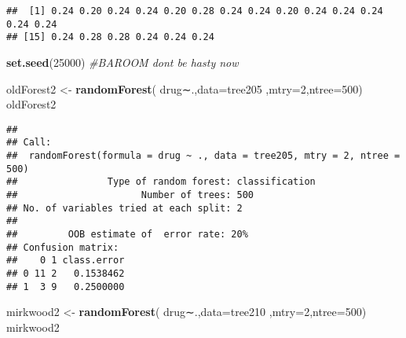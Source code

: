 \documentclass[]{article}
\newenvironment{Shaded}{\begin{snugshade}}{\end{snugshade}}
\newcommand{\KeywordTok}[1]{\textcolor[rgb]{0.13,0.29,0.53}{\textbf{#1}}}
\newcommand{\DataTypeTok}[1]{\textcolor[rgb]{0.13,0.29,0.53}{#1}}
\newcommand{\DecValTok}[1]{\textcolor[rgb]{0.00,0.00,0.81}{#1}}
\newcommand{\StringTok}[1]{\textcolor[rgb]{0.31,0.60,0.02}{#1}}
\newcommand{\CommentTok}[1]{\textcolor[rgb]{0.56,0.35,0.01}{\textit{#1}}}
\newcommand{\ControlFlowTok}[1]{\textcolor[rgb]{0.13,0.29,0.53}{\textbf{#1}}}
\newcommand{\OperatorTok}[1]{\textcolor[rgb]{0.81,0.36,0.00}{\textbf{#1}}}
\newcommand{\NormalTok}[1]{#1}
\begin{document}
\begin{Shaded}
\end{Shaded}

\begin{verbatim}
##  [1] 0.24 0.20 0.24 0.24 0.20 0.28 0.24 0.24 0.20 0.24 0.24 0.24 0.24 0.24
## [15] 0.24 0.28 0.28 0.24 0.24 0.24
\end{verbatim}

\begin{Shaded}
\begin{Highlighting}[]
\KeywordTok{set.seed}\NormalTok{(}\DecValTok{25000}\NormalTok{)}
\CommentTok{#BAROOM dont be hasty now}

\NormalTok{oldForest2 <-}\StringTok{ }\KeywordTok{randomForest}\NormalTok{( drug∼.,}\DataTypeTok{data=}\NormalTok{tree205  ,}\DataTypeTok{mtry=}\DecValTok{2}\NormalTok{,}\DataTypeTok{ntree=}\DecValTok{500}\NormalTok{)}
\NormalTok{oldForest2}
\end{Highlighting}
\end{Shaded}

\begin{verbatim}
## 
## Call:
##  randomForest(formula = drug ~ ., data = tree205, mtry = 2, ntree = 500) 
##                Type of random forest: classification
##                      Number of trees: 500
## No. of variables tried at each split: 2
## 
##         OOB estimate of  error rate: 20%
## Confusion matrix:
##    0 1 class.error
## 0 11 2   0.1538462
## 1  3 9   0.2500000
\end{verbatim}

\begin{Shaded}
\begin{Highlighting}[]
\NormalTok{mirkwood2 <-}\StringTok{ }\KeywordTok{randomForest}\NormalTok{( drug∼.,}\DataTypeTok{data=}\NormalTok{tree210  ,}\DataTypeTok{mtry=}\DecValTok{2}\NormalTok{,}\DataTypeTok{ntree=}\DecValTok{500}\NormalTok{)}
\NormalTok{mirkwood2}
\end{Highlighting}
\end{Shaded}
\end{document}
